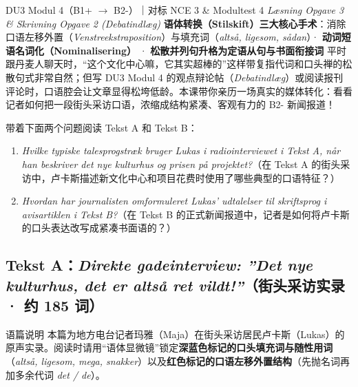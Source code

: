 {DU3 Modul 4（B1+ $\rightarrow$ B2-）｜对标 NCE 3 \& Modultest 4 \textit{Læsning Opgave 3 \& Skrivning Opgave 2 (Debatindlæg)}}
{\textbf{语体转换（Stilskift）三大核心手术}：消除口语左移外置（\textit{Venstreekstraposition}）与填充词（\textit{altså, ligesom, sådan}）· \textbf{动词短语名词化（Nominalisering）} · \textbf{松散并列句升格为定语从句与书面衔接词}}
{平时跟丹麦人聊天时，“这个文化中心嘛，它其实超棒的”这样带复指代词和口头禅的松散句式非常自然；但写 DU3 Modul 4 的观点辩论帖（\textit{Debatindlæg}）或阅读报刊评论时，口语腔会让文章显得松垮低龄。本课带你亲历一场真实的媒体转化：看看记者如何把一段街头采访口语，浓缩成结构紧凑、客观有力的 B2- 新闻报道！}

\begin{foerduleaeser}
带着下面两个问题阅读 Tekst A 和 Tekst B：
\begin{enumerate}
  \item \textit{Hvilke typiske talesprogstræk bruger Lukas i radiointerviewet i Tekst A, når han beskriver det nye kulturhus og prisen på projektet?}（在 Tekst A 的街头采访中，卢卡斯描述新文化中心和项目花费时使用了哪些典型的口语特征？）
  \item \textit{Hvordan har journalisten omformuleret Lukas' udtalelser til skriftsprog i avisartiklen i Tekst B?}（在 Tekst B 的正式新闻报道中，记者是如何将卢卡斯的口头表达改写成紧凑书面语的？）
\end{enumerate}
\end{foerduleaeser}


\subsection*{Tekst A：\textit{Direkte gadeinterview: ”Det nye kulturhus, det er altså ret vildt!”}（街头采访实录 · 约 185 词）}

\begin{tipbox}{语篇说明}
本篇为地方电台记者玛雅（Maja）在街头采访居民卢卡斯（Lukas）的原声实录。阅读时请用“语体显微镜”锁定\textbf{\color{NCDNavy}深蓝色标记的口头填充词与随性用词}（\textit{altså, ligesom, mega, snakker}）以及\textbf{\color{NCDRed}红色标记的口语左移外置结构}（先抛名词再加多余代词 \textit{det / de}）。
\end{tipbox}

